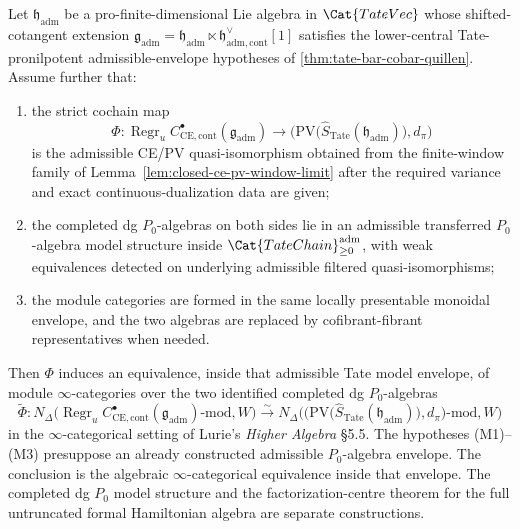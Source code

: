 \begin{thm}
\label{thm:admissible-envelope-module-reconstruction}
  Let $\mathfrak h_{\mathrm{adm}}$ be a pro-finite-dimensional Lie algebra in
  $\Cat{TateVec}$ whose shifted-cotangent extension
  $\mathfrak g_{\mathrm{adm}}
  =\mathfrak h_{\mathrm{adm}}\ltimes
  \mathfrak h_{\mathrm{adm},\mathrm{cont}}^\vee[1]$
  satisfies the lower-central Tate-pronilpotent admissible-envelope hypotheses of
  \ref{thm:tate-bar-cobar-quillen}.  Assume further that:
  \begin{enumerate}[label=(M\arabic*)]
    \item the strict cochain map
  $$\Phi\colon \operatorname{Regr}_u
    C^\bullet_{\mathrm{CE},\mathrm{cont}}(\mathfrak g_{\mathrm{adm}})
    \longrightarrow \bigl(\mathrm{PV}\bigl(
    \widehat S_{\mathrm{Tate}}(\mathfrak h_{\mathrm{adm}})\bigr),
    d_\pi\bigr)$$
      is the admissible CE/PV quasi-isomorphism obtained from the
      finite-window family of Lemma~\ref{lem:closed-ce-pv-window-limit}
      after the required variance and exact continuous-dualization data
      are given;
    \item the completed dg \(P_0\)-algebras on both sides lie in an
      admissible transferred \(P_0\)-algebra model structure inside
      \(\Cat{TateChain}_{\geq0}^{\mathrm{adm}}\), with weak
      equivalences detected on underlying admissible filtered
      quasi-isomorphisms;
    \item the module categories are formed in the same locally
      presentable monoidal envelope, and the two algebras are replaced by
      cofibrant-fibrant representatives when needed.
  \end{enumerate}
  Then \(\Phi\) induces an equivalence, inside that admissible Tate
  model envelope, of module $\infty$-categories over the two identified
  completed dg \(P_0\)-algebras
  $$\widetilde\Phi\colon
    N_\Delta\bigl(\operatorname{Regr}_u
      C^\bullet_{\mathrm{CE},\mathrm{cont}}(\mathfrak g_{\mathrm{adm}})
      \text{-mod},W\bigr)
    \xrightarrow{\sim}
    N_\Delta\bigl(\bigl(\mathrm{PV}\bigl(
      \widehat S_{\mathrm{Tate}}(\mathfrak h_{\mathrm{adm}})\bigr),
      d_\pi\bigr)\text{-mod},W\bigr)$$
  in the \(\infty\)-categorical setting of Lurie's \emph{Higher Algebra}
  \S 5.5.  The
  hypotheses (M1)--(M3) presuppose an already constructed admissible
  \(P_0\)-algebra envelope. The conclusion is the algebraic
  $\infty$-categorical equivalence inside that envelope. The completed
  dg \(P_0\) model structure and the factorization-centre theorem for
  the full untruncated formal Hamiltonian algebra are separate
  constructions.
\end{thm}

